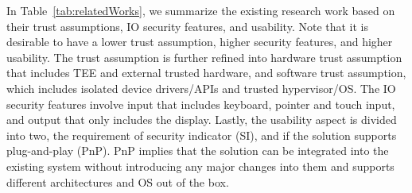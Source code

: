 %     


In Table~\ref{tab:relatedWorks}, we summarize the existing research work based on their trust assumptions, IO security features, and usability. Note that it is desirable to have a lower trust assumption, higher security features, and higher usability. The trust assumption is further refined into hardware trust assumption that includes TEE and external trusted hardware, and software trust assumption, which includes isolated device drivers/APIs and trusted hypervisor/OS. The IO security features involve input that includes keyboard, pointer and touch input, and output that only includes the display. Lastly, the usability aspect is divided into two, the requirement of security indicator (SI), and if the solution supports plug-and-play (PnP). PnP implies that the solution can be integrated into the existing system without introducing any major changes into them and supports different architectures and OS out of the box.  


